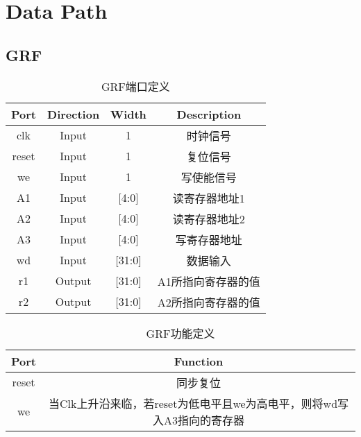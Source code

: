 \documentclass[UTF8]{ctexart}
\begin{document}
\section{Data Path}
\subsection{GRF}
\begin{table}[H]
	\centering
	\begin{threeparttable}
		\caption{GRF端口定义}
		\begin{tabular}{cccc}
			\toprule
			\rowcolor{mypink}
			\textbf{Port} & \textbf{Direction} & \textbf{Width} & \textbf{Description} \\
			\midrule
			clk           & Input              & 1              & 时钟信号             \\
			\midrule
			reset         & Input              & 1              & 复位信号             \\
			\midrule
			we            & Input              & 1              & 写使能信号           \\
			\midrule
			A1            & Input              & [4:0]          & 读寄存器地址1        \\
			\midrule
			A2            & Input              & [4:0]          & 读寄存器地址2        \\
			\midrule
			A3            & Input              & [4:0]          & 写寄存器地址         \\
			\midrule
			wd            & Input              & [31:0]         & 数据输入             \\
			\midrule
			r1            & Output             & [31:0]         & A1所指向寄存器的值   \\
			\midrule
			r2            & Output             & [31:0]         & A2所指向寄存器的值   \\
			\midrule
		\end{tabular}
	\end{threeparttable}
\end{table}
\begin{table}[H]
	\centering
	\begin{threeparttable}
		\caption{GRF功能定义}
		\begin{tabular}{cc}
			\toprule
			\rowcolor{mypink}
			\textbf{Port} & \textbf{Function}                                                      \\
			\midrule
			reset         & 同步复位                                                               \\
			\midrule
			we            & 当Clk上升沿来临，若reset为低电平且we为高电平，则将wd写入A3指向的寄存器 \\
			\midrule
		\end{tabular}
	\end{threeparttable}
\end{table}
\newpage
\end{document}
